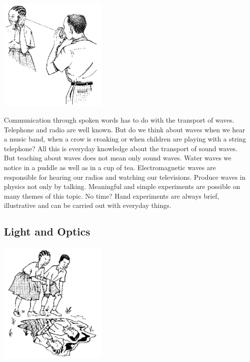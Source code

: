 \begin{multicols}{2}
\begin{center}
\includegraphics[width=0.4\textwidth]{./img/source/wave-motion.jpg}
\end{center}

Communication through spoken words has to do with the transport of waves. Telephone and
radio are well known. But do we think about waves when we hear a music band, when a crow
is croaking or when children are playing with a string telephone? All this is everyday knowledge about the transport of sound waves.\\

But teaching about waves does not mean only sound waves. Water waves we notice in a puddle as well as in a cup of tea. Electromagnetic waves are responsible for hearing our radios and watching our televisions.
Produce waves in physics not only by talking. Meaningful and simple experiments are
possible on many themes of this topic. No time? Hand experiments are always brief,
illustrative and can be carried out with everyday things.

\subsection{Light and Optics}

\begin{center}
\includegraphics[width=0.4\textwidth]{./img/source/light-optics.png}
\end{center}


\end{multicols}
